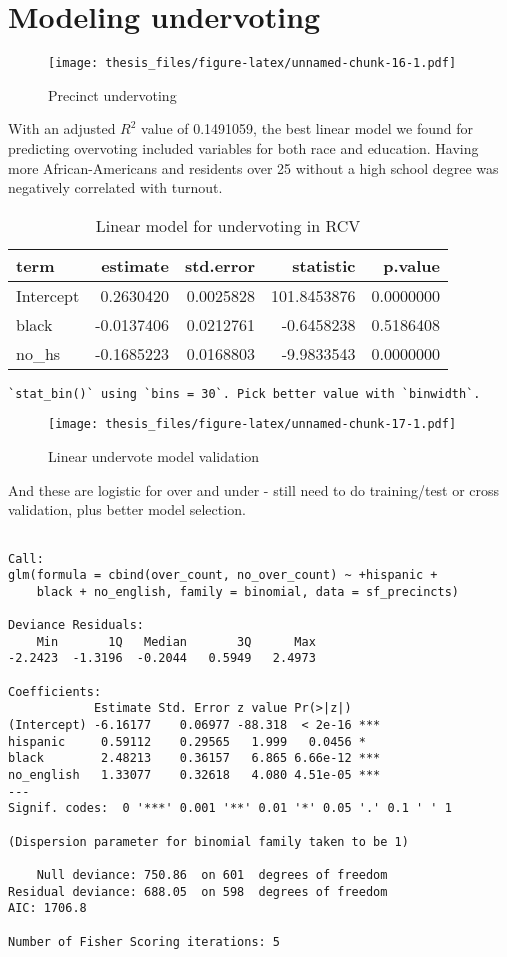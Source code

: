 \documentclass[12pt,twoside]{reedthesis}
\theoremstyle{definition}
\theoremstyle{definition}
\theoremstyle{definition}
\theoremstyle{remark}
\begin{document}
\hypertarget{modeling-undervoting}{%
\section{Modeling undervoting}\label{modeling-undervoting}}
\begin{figure}
\centering
\texttt{[image: thesis\_files/figure-latex/unnamed-chunk-16-1.pdf]}
\caption{\label{fig:unnamed-chunk-16}Precinct undervoting}
\end{figure}
With an adjusted \(R^2\) value of 0.1491059, the best linear model we
found for predicting overvoting included variables for both race and
education. Having more African-Americans and residents over 25 without a
high school degree was negatively correlated with turnout.
\begin{longtable}[t]{lrrrr}
\caption[Linear undervote model]{\label{tab:unnamed-chunk-17}Linear model for undervoting in RCV}\\
\toprule
term & estimate & std.error & statistic & p.value\\
\midrule
Intercept & 0.2630420 & 0.0025828 & 101.8453876 & 0.0000000\\
black & -0.0137406 & 0.0212761 & -0.6458238 & 0.5186408\\
no\_hs & -0.1685223 & 0.0168803 & -9.9833543 & 0.0000000\\
\bottomrule
\end{longtable}
\begin{verbatim}
`stat_bin()` using `bins = 30`. Pick better value with `binwidth`.
\end{verbatim}
\begin{figure}
\centering
\texttt{[image: thesis\_files/figure-latex/unnamed-chunk-17-1.pdf]}
\caption{\label{fig:unnamed-chunk-17}Linear undervote model validation}
\end{figure}
And these are logistic for over and under - still need to do
training/test or cross validation, plus better model selection.
\begin{verbatim}

Call:
glm(formula = cbind(over_count, no_over_count) ~ +hispanic + 
    black + no_english, family = binomial, data = sf_precincts)

Deviance Residuals: 
    Min       1Q   Median       3Q      Max  
-2.2423  -1.3196  -0.2044   0.5949   2.4973  

Coefficients:
            Estimate Std. Error z value Pr(>|z|)    
(Intercept) -6.16177    0.06977 -88.318  < 2e-16 ***
hispanic     0.59112    0.29565   1.999   0.0456 *  
black        2.48213    0.36157   6.865 6.66e-12 ***
no_english   1.33077    0.32618   4.080 4.51e-05 ***
---
Signif. codes:  0 '***' 0.001 '**' 0.01 '*' 0.05 '.' 0.1 ' ' 1

(Dispersion parameter for binomial family taken to be 1)

    Null deviance: 750.86  on 601  degrees of freedom
Residual deviance: 688.05  on 598  degrees of freedom
AIC: 1706.8

Number of Fisher Scoring iterations: 5
\end{verbatim}
\end{document}
